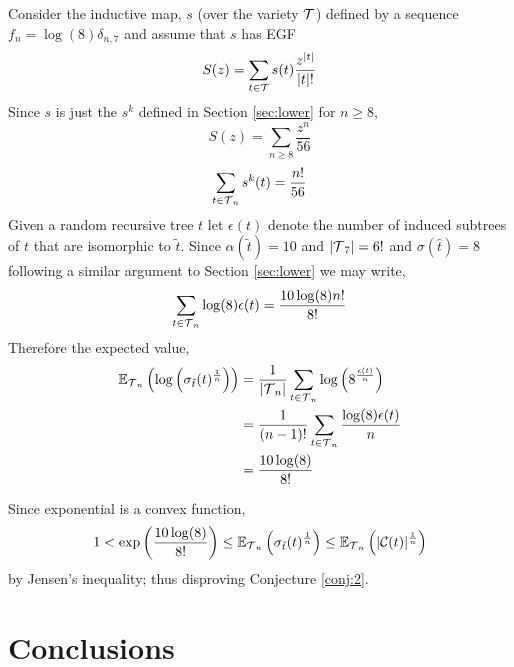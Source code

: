 Consider the inductive map, $s$  (over the variety $\operatorname{\mathcal{T}}$) defined by a sequence $f_n = \log(8)\delta_{n,7}$ and assume that $s$ has EGF
\begin{equation}\label{eq:9}
  S(z) = \sum_{t \in \operatorname{\mathcal{T}}} s(t)\frac{z^{\lvert t \rvert}}{\lvert t \rvert !}
\end{equation}
Since $s$ is just the $s^k$ defined in Section \ref{sec:lower} for $n \geq 8$,
\begin{equation}\label{eq:10}
 S(z) = \sum_{n \geq 8} \frac{z^n}{56}
\end{equation}
\[
 \sum_{t \in \operatorname{\mathcal{T}}_n}s^k(t) = \frac{n!}{56}
\]
Given a random recursive tree $t$ let $\epsilon(t)$ denote the number of induced subtrees of $t$ that are isomorphic to 
$\tilde{t}$. Since $\alpha(\tilde{t}) = 10$ and $\lvert \operatorname{\mathcal{T}}_7 \rvert = 6!$ and $\sigma(\hat{t}) = 8$ 
following a similar argument to Section \ref{sec:lower} 
we may write,
\[
 \sum_{t \in \operatorname{\mathcal{T}}_n}\log(8)\epsilon(t) = \frac{10\log(8)n!}{8!}
\]
Therefore the expected value, 
\begin{align}
 \mathbb{E}_{\operatorname{\mathcal{T}}_n}\left(\log\left(\sigma_{\tilde{t}}(t)^{\frac{1}{n}}\right)\right) &= \frac{1}{\lvert \operatorname{\mathcal{T}}_n \rvert}\sum_{t \in \operatorname{\mathcal{T}}_n} \log\left(8^{\frac{\epsilon(t)}{n}}\right) \\
 &= \frac{1}{(n-1)!}\sum_{t \in \operatorname{\mathcal{T}}_n} \frac{\log(8)\epsilon(t)}{n} \\
 &= \frac{10\log(8)}{8!}
\end{align}

Since exponential is a convex function,
\[
 1 < \exp\left( \frac{10\log(8)}{8!}\right) \leq \mathbb{E}_{\operatorname{\mathcal{T}}_n}\left(\sigma_{\tilde{t}}(t)^{\frac{1}{n}}\right) \leq \mathbb{E}_{\operatorname{\mathcal{T}}_n} \left( \lvert \mathcal{C}(t) \rvert^{\frac{1}{n}}   \right)
\]
by Jensen's inequality; thus disproving Conjecture \ref{conj:2}.  
\section{Conclusions}\label{sec:conc}





